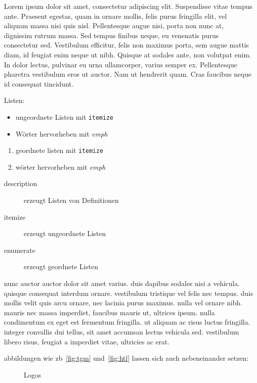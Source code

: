\documentclass[medt,2017]{hitda}
\begin{document}
Lorem ipsum dolor sit amet, consectetur adipiscing elit. Suspendisse vitae tempus ante. Praesent egestas, quam in ornare mollis, felis purus fringilla elit, vel aliquam massa nisi quis nisl. Pellentesque augue nisi, porta non nunc at, dignissim rutrum massa. Sed tempus finibus neque, eu venenatis purus consectetur sed. Vestibulum efficitur, felis non maximus porta, sem augue mattis diam, id feugiat enim neque ut nibh. Quisque at sodales ante, non volutpat enim. In dolor lectus, pulvinar eu urna ullamcorper, varius semper ex. Pellentesque pharetra vestibulum eros ut auctor. Nam ut hendrerit quam. Cras faucibus neque id consequat tincidunt.

\cite{testurl}

Listen:
\begin{itemize}
	\item ungeordnete Listen mit \texttt{itemize}
	\item Wörter hervorheben mit \emph{emph}
\end{itemize}
\begin{enumerate}
	\item geordnete listen mit \texttt{itemize}
	\item wörter hervorheben mit \emph{emph}
\end{enumerate}
\begin{description}
	\item[description] erzeugt Listen von Definitionen
	\item[itemize] erzeugt ungeordnete Listen
	\item[enumerate] erzeugt geordnete Listen
\end{description}

nunc auctor auctor dolor sit amet varius. duis dapibus sodales nisi a vehicula. quisque consequat interdum ornare. vestibulum tristique vel felis nec tempus. duis mollis velit quis arcu ornare, nec lacinia purus maximus. nulla vel ornare nibh. mauris nec massa imperdiet, faucibus mauris ut, ultrices ipsum. nulla condimentum ex eget est fermentum fringilla. ut aliquam ac risus luctus fringilla. integer convallis dui tellus, sit amet accumsan lectus vehicula sed. vestibulum libero risus, feugiat a imperdiet vitae, ultricies ac erat.

abbildungen wie zb~\ref{fig:tgm} und~\ref{fig:htl} lassen sich auch nebeneinander setzen:

\begin{figure}[h]
\centering
{}
\hspace{3em}
\caption{Logos}

\end{figure}
\end{document}
